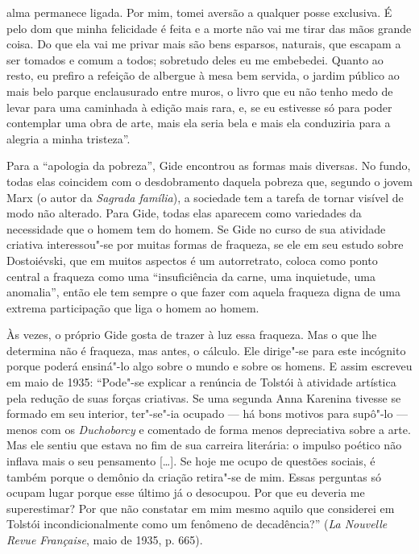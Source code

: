{  alma permanece ligada. Por mim, tomei aversão a qualquer posse
  exclusiva. É pelo dom que minha felicidade é feita e a morte não vai
  me tirar das mãos grande coisa. Do que ela vai me privar mais são bens
  esparsos, naturais, que escapam a ser tomados e comum a todos;
  sobretudo deles eu me embebedei. Quanto ao resto, eu prefiro a
  refeição de albergue à mesa bem servida, o jardim público ao mais belo
  parque enclausurado entre muros, o livro que eu não tenho medo de
  levar para uma caminhada à edição mais rara, e, se eu estivesse só
  para poder contemplar uma obra de arte, mais ela seria bela e mais ela
  conduziria para a alegria a minha tristeza''. \versal{[N. E.]}} %

Para a ``apologia da pobreza'', Gide encontrou as formas mais diversas.
No fundo, todas elas coincidem com o desdobramento daquela pobreza que,
segundo o jovem Marx (o autor da \emph{Sagrada família}), a sociedade
tem a tarefa de tornar visível de modo não alterado. Para Gide, todas elas
aparecem como variedades da necessidade que o homem tem do homem. Se
Gide no curso de sua atividade criativa interessou"-se por muitas formas
de fraqueza, se ele em seu estudo sobre Dostoiévski, que em muitos
aspectos é um autorretrato, coloca como ponto central a fraqueza como
uma ``insuficiência da carne, uma inquietude, uma anomalia'', então ele
tem sempre o que fazer com aquela fraqueza digna de uma extrema
participação que liga o homem ao homem.

Às vezes, o próprio Gide gosta de trazer à luz essa fraqueza. Mas o que
lhe determina não é fraqueza, mas antes, o cálculo. Ele dirige"-se para
este incógnito porque poderá ensiná"-lo algo sobre o mundo e sobre os
homens. E assim escreveu em maio de 1935: ``Pode"-se explicar a renúncia
de Tolstói à atividade artística pela redução de suas forças criativas.
Se uma segunda Anna Karenina tivesse se formado em seu interior,
ter"-se"-ia ocupado --- há bons motivos para supô"-lo --- menos com os
\emph{Duchoborcy} e comentado de forma menos depreciativa sobre a arte. %
Mas ele sentiu que estava no fim de sua carreira literária: o impulso
poético não inflava mais o seu pensamento [\ldots{}]. Se hoje me ocupo de
questões sociais, é também porque o demônio da criação retira"-se de mim.
Essas perguntas só ocupam lugar porque esse último já o desocupou. Por
que eu deveria me superestimar? Por que não constatar em mim mesmo
aquilo que considerei em Tolstói incondicionalmente como um fenômeno de
decadência?'' (\emph{La Nouvelle Revue Française}, maio de 1935, p.
665).

